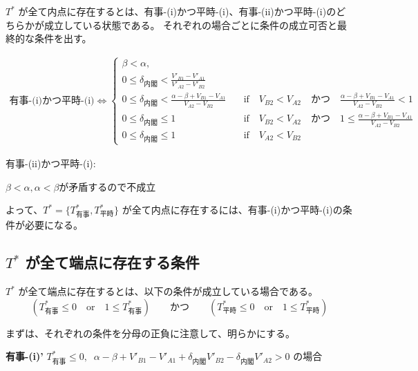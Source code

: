 \documentclass[main.tex]{subfiles}
\begin{document}
\bigskip
$T^*$ が全て内点に存在するとは、有事-(i)かつ平時-(i)、有事-(ii)かつ平時-(i)のどちらかが成立している状態である。
それぞれの場合ごとに条件の成立可否と最終的な条件を出す。

\noindent
\begin{align*}
    \text{有事-(i)かつ平時-(i)} \Leftrightarrow 
    \begin{cases}
        \beta < \alpha, \\
        0 \le \delta_{内閣} < \frac{V'_{B1}-V'_{A1}}{V'_{A2} - V'_{B2}}\\
        0 \le \delta_{内閣} < \frac{\alpha-\beta + V_{B1}-V_{A1}}{V_{A2} - V_{B2}} \quad&\text{if}\quad V_{B2} < V_{A2} \quad{かつ}\quad \frac{\alpha-\beta + V_{B1}-V_{A1}}{V_{A2} - V_{B2}}<1\\
        0 \le \delta_{内閣} \le 1 \quad&\text{if}\quad V_{B2} < V_{A2} \quad{かつ}\quad 1 \le \frac{\alpha-\beta + V_{B1}-V_{A1}}{V_{A2} - V_{B2}}\\
        0 \le \delta_{内閣} \le 1 \quad&\text{if}\quad V_{A2} < V_{B2}
    \end{cases}
\end{align*}

\noindent
有事-(ii)かつ平時-(i):

$\beta < \alpha, \alpha < \beta$が矛盾するので不成立


\bigskip
よって、$T^* = \lbrace T^*_{有事}, T^*_{平時} \rbrace$ が全て内点に存在するには、有事-(i)かつ平時-(i)の条件が必要になる。











\subsection{$T^*$ が全て端点に存在する条件}


$T^*$ が全て端点に存在するとは、以下の条件が成立している場合である。\\
$$(T^*_{有事} \le 0 \quad\text{or}\quad 1 \le T^*_{有事}) \quad\quad\text{かつ}\quad\quad (T^*_{平時} \le 0 \quad\text{or}\quad 1 \le T^*_{平時}) $$


まずは、それぞれの条件を分母の正負に注意して、明らかにする。

\bigskip
\textbf{有事-(i)'}\; $T^*_{有事} \le 0,\;\; \alpha-\beta + V'_{B1}-V'_{A1} + \delta_{内閣}V'_{B2} - \delta_{内閣}V'_{A2} > 0$ の場合
\end{document}
